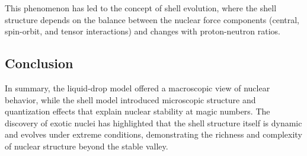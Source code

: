 This phenomenon has led to the concept of shell evolution, where the shell structure depends on the balance between the nuclear force components (central, spin-orbit, and tensor interactions) and changes with proton-neutron ratios.

\subsection{Conclusion}

In summary, the liquid-drop model offered a macroscopic view of nuclear behavior, while the shell model introduced microscopic structure and quantization effects that explain nuclear stability at magic numbers. The discovery of exotic nuclei has highlighted that the shell structure itself is dynamic and evolves under extreme conditions, demonstrating the richness and complexity of nuclear structure beyond the stable valley.

%
%

%
%
%
%
%
%
%
%
%
